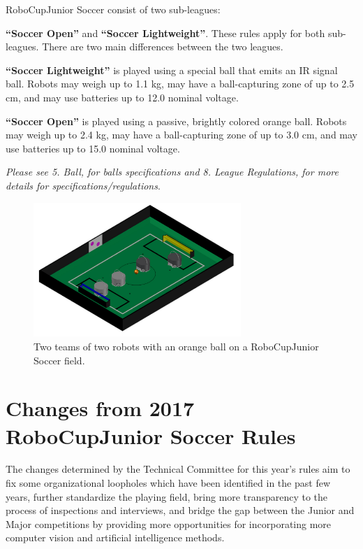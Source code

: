 \documentclass{article}
\begin{document}
RoboCupJunior Soccer consist of two sub-leagues:

\textbf{``Soccer Open''} and \textbf{``Soccer Lightweight''}. These rules apply
for both sub-leagues. There are two main differences between the two leagues.

\textbf{``Soccer Lightweight''} is played using a special ball that emits an IR
signal ball. Robots may weigh up to 1.1 kg, may have a ball-capturing zone of
up to 2.5 cm, and may use batteries up to 12.0 nominal voltage.

\textbf{``Soccer Open''} is played using a passive, brightly colored orange
ball. Robots may weigh up to 2.4 kg, may have a ball-capturing zone of up to
3.0 cm, and may use batteries up to 15.0 nominal voltage.

\textit{Please see 5. Ball, for balls specifications and 8. League
Regulations, for more details for specifications/regulations}.

\begin{figure}[H]
    \centering
    \includegraphics[width=0.7\textwidth]{media/image1_new.jpeg}
    \caption{Two teams of two robots with an orange ball on a RoboCupJunior
        Soccer field.}
    \label{fig:name}
\end{figure}

\section*{Changes from 2017 RoboCupJunior Soccer Rules}

The changes determined by the Technical Committee for this year's rules aim to
fix some organizational loopholes which have been identified in the past few
years, further standardize the playing field, bring more transparency to the
process of inspections and interviews, and bridge the gap between the Junior
and Major competitions by providing more opportunities for incorporating more
computer vision and artificial intelligence methods.
\end{document}
